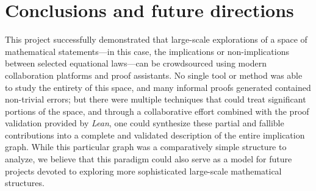 \section{Conclusions and future directions}

This project successfully demonstrated that large-scale explorations of a space of mathematical statements---in this case, the implications or non-implications between selected equational laws---can be crowdsourced using modern collaboration platforms and proof assistants.  No single tool or method was able to study the entirety of this space, and many informal proofs generated contained non-trivial errors; but there were multiple techniques that could treat significant portions of the space, and through a collaborative effort combined with the proof validation provided by \emph{Lean}, one could synthesize these partial and fallible contributions into a complete and validated description of the entire implication graph.  While this particular graph was a comparatively simple structure to analyze, we believe that this paradigm could also serve as a model for future projects devoted to exploring more sophisticated large-scale mathematical structures.

